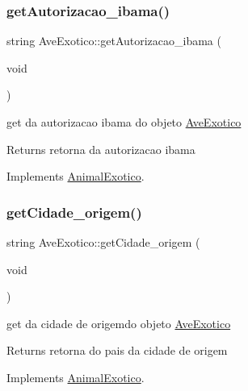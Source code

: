 \subsubsection{\texorpdfstring{getAutorizacao\_ibama()}{getAutorizacao\_ibama()}}
{\footnotesize\ttfamily string Ave\+Exotico\+::get\+Autorizacao\+\_\+ibama (\begin{DoxyParamCaption}\item[{void}]{ }\end{DoxyParamCaption})\hspace{0.3cm}{\ttfamily [virtual]}}



get da autorizacao ibama do objeto \mbox{\hyperlink{class_ave_exotico}{Ave\+Exotico}} 

\begin{DoxyReturn}{Returns}
retorna da autorizacao ibama 
\end{DoxyReturn}


Implements \mbox{\hyperlink{class_animal_exotico}{Animal\+Exotico}}.

\mbox{\label{class_ave_exotico_ae8ea1dd8dd3af80c99e6daf326f2da3a}} 
\subsubsection{\texorpdfstring{getCidade\_origem()}{getCidade\_origem()}}
{\footnotesize\ttfamily string Ave\+Exotico\+::get\+Cidade\+\_\+origem (\begin{DoxyParamCaption}\item[{void}]{ }\end{DoxyParamCaption})\hspace{0.3cm}{\ttfamily [virtual]}}



get da cidade de origemdo objeto \mbox{\hyperlink{class_ave_exotico}{Ave\+Exotico}} 

\begin{DoxyReturn}{Returns}
retorna do pais da cidade de origem 
\end{DoxyReturn}


Implements \mbox{\hyperlink{class_animal_exotico}{Animal\+Exotico}}.

\mbox{\label{class_ave_exotico_a1c7d53e251fa66937f2699d2bebb505e}} 
